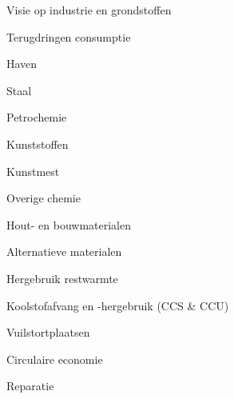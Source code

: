 
\begin{visie-concept}{Visie op industrie en grondstoffen}\end{visie-concept}

\begin{voorstel-concept}{Terugdringen consumptie}\end{voorstel-concept}
\begin{voorstel-concept}{Haven}\end{voorstel-concept}
\begin{voorstel-concept}{Staal}\end{voorstel-concept}
\begin{voorstel-concept}{Petrochemie}\end{voorstel-concept}
\begin{voorstel-concept}{Kunststoffen}\end{voorstel-concept}
\begin{voorstel-concept}{Kunstmest}\end{voorstel-concept}
\begin{voorstel-concept}{Overige chemie}\end{voorstel-concept}
\begin{voorstel-concept}{Hout- en bouwmaterialen}\end{voorstel-concept}
\begin{voorstel-concept}{Alternatieve materialen}\end{voorstel-concept}
\begin{voorstel-concept}{Hergebruik restwarmte}\end{voorstel-concept}
\begin{voorstel-concept}{Koolstofafvang en -hergebruik (CCS \& CCU)}\end{voorstel-concept}
\begin{voorstel-concept}{Vuilstortplaatsen}\end{voorstel-concept}
\begin{voorstel-concept}{Circulaire economie}\end{voorstel-concept}
\begin{voorstel-concept}{Reparatie}\end{voorstel-concept}

